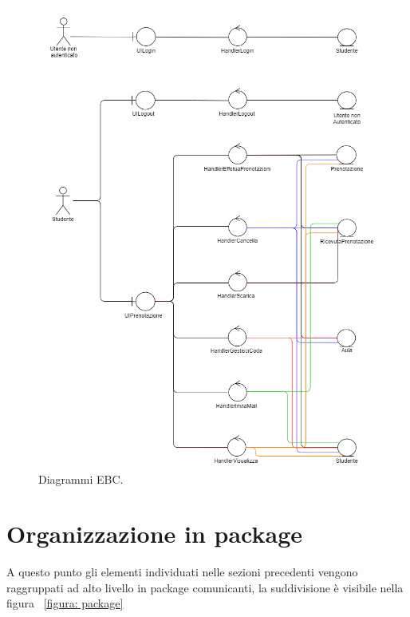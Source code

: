 	
\begin{figure}[H]
\begin{center}
  \includegraphics[width=0.8 \textwidth]{Figure/EBC.png}
    \caption{Diagrammi EBC.}\label{figura: EBC}
\end{center}
\end{figure}
	
	  

\section{Organizzazione in package}
A questo punto gli elementi individuati nelle sezioni precedenti vengono raggruppati ad alto livello in package comunicanti, la suddivisione è visibile nella figura ~\ref{figura: package} 


